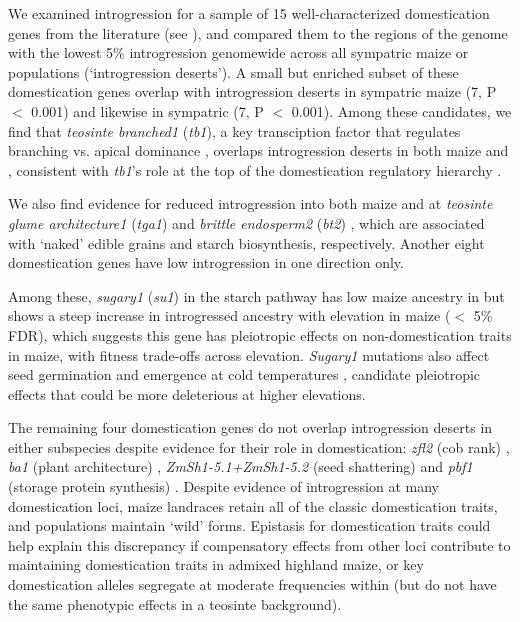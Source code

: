 We examined introgression for a sample of 15 well-characterized domestication genes from the literature (see ), and compared them to the regions of the genome with the lowest 5\% introgression genomewide across all sympatric maize or \mexicana populations (‘introgression deserts'). A small but enriched subset of these domestication genes overlap with introgression deserts in sympatric maize (7, P $<$ 0.001) and likewise in sympatric \mexicana (7, P $<$ 0.001).
Among these candidates, we find that \textit{teosinte branched1} (\textit{tb1}), a key transciption factor that regulates branching vs. apical dominance \cite{Doebley_Stec_Gustus:1995_tb1, Doebley_Stec_Hubbard:1997_tb1}, overlaps introgression deserts in both maize and \mexicana, consistent with \textit{tb1}'s role at the top of the domestication regulatory hierarchy \cite{Dong:2019_reg_domestication}.

We also find evidence for reduced introgression into both maize and \mexicana at \textit{teosinte glume architecture1} (\textit{tga1}) \cite{Dorweiler:1993, Wang:2005_tga1} and \textit{brittle endosperm2} (\textit{bt2}) \cite{Whitt:2002_starch}, which are associated with ‘naked' edible grains and starch biosynthesis, respectively. 
Another eight domestication genes \cite{Wills:2018_zagl1, Wills:2013_gt1, Sosso:2015, Vollbrecht:2005_ramosa, Sigmon_Vollbrecht:2010, Lin:2012_shattering, Whitt:2002_starch} have low introgression in one direction only.


Among these, \textit{sugary1} (\textit{su1}) in the starch pathway has low maize ancestry in \mexicana but shows a steep increase in introgressed \mexicana ancestry with elevation in maize ($<$ 5\% FDR), which suggests this gene has pleiotropic effects on non-domestication traits in maize, with fitness trade-offs across elevation. 
\textit{Sugary1} mutations  also affect seed germination and emergence at cold temperatures \cite{Trimble:2016_sugary1}, candidate pleiotropic effects that could be more deleterious at higher elevations. 

The remaining four domestication genes do not overlap introgression deserts in either subspecies despite evidence for their role in domestication: \textit{zfl2} (cob rank) \cite{Doebley_Stec:1991, Doebley_Stec:1993, Bomblies_Doebley:2006}, \textit{ba1} (plant architecture) \cite{Gallavotti:2004_ba1}, \textit{ZmSh1-5.1+ZmSh1-5.2} (seed shattering) \cite{Lin:2012_shattering} and \textit{pbf1} (storage protein synthesis) \cite{Wang:1998_pbf}. Despite evidence of introgression at many domestication loci, maize landraces retain all of the classic domestication traits, and \mexicana populations maintain ‘wild' forms. 
Epistasis for domestication traits \cite{Stitzer_Ibarra:2018} could help explain this discrepancy if compensatory effects from other loci contribute to maintaining domestication traits in admixed highland maize, or key domestication alleles segregate at moderate frequencies within \mexicana (but do not have the same phenotypic effects in a teosinte background).

